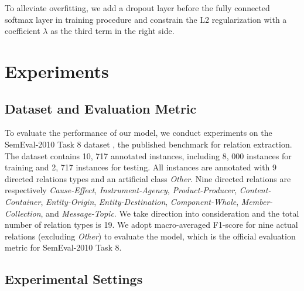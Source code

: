 \documentclass[conference]{IEEEtran}
\begin{document}
To alleviate overfitting, we add a dropout layer before the fully connected softmax layer in training procedure and constrain the L2 regularization with a coefficient \begin{math} \lambda \end{math} as the third term in the right side.

\section{Experiments}

\subsection{Dataset and Evaluation Metric}
 
To evaluate the performance of our model, we conduct experiments on the SemEval-2010 Task 8 dataset \cite{hendrickx2009semeval}, the published benchmark for relation extraction. The dataset contains 10, 717 annotated instances, including 8, 000 instances for training and 2, 717 instances for testing. All instances are annotated with 9 directed relations types and an artificial class {\em Other}. Nine directed relations are respectively {\em Cause-Effect}, {\em Instrument-Agency}, {\em Product-Producer}, {\em Content-Container}, {\em Entity-Origin}, {\em Entity-Destination}, {\em Component-Whole}, {\em Member-Collection}, and {\em Message-Topic}. We take direction into consideration and the total number of relation types is 19. We adopt macro-averaged F1-score for nine actual relations (excluding {\em Other}) to evaluate the model, which is the official evaluation metric for SemEval-2010 Task 8.

\subsection{Experimental Settings}
\end{document}
